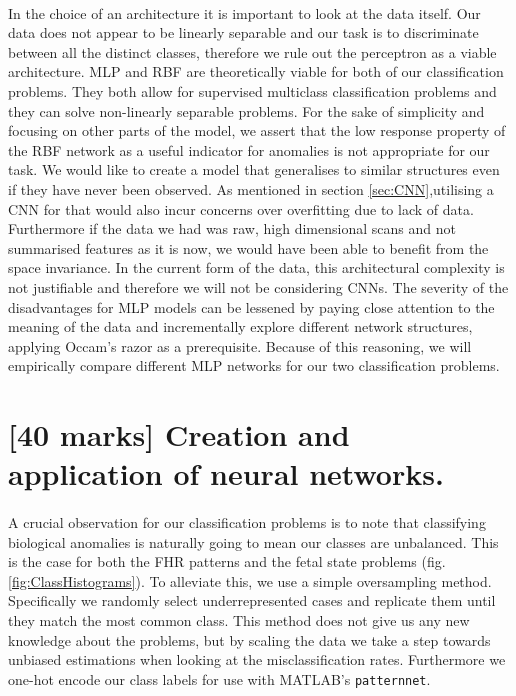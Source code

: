 \documentclass[11pt,a4paper]{article}
\begin{document}
\paragraph{}
In the choice of an architecture it is important to look at the data itself. Our data does not appear to be linearly separable and our task is to discriminate between all the distinct classes, therefore we rule out the perceptron as a viable architecture.
MLP and RBF are theoretically viable for both of our classification problems. They both allow for supervised multiclass classification problems and they can solve non-linearly separable problems. For the sake of simplicity and focusing on other parts of the model, we assert that the low response property of the RBF network as a useful indicator for anomalies is not appropriate for our task. We would like to create a model that generalises to similar structures even if they have never been observed. As mentioned in section \ref{sec:CNN},utilising a CNN for that would also incur concerns over overfitting due to lack of data. Furthermore if the data we had was raw, high dimensional scans and not summarised features as it is now, we would have been able to benefit from the space invariance. In the current form of the data, this architectural complexity is not justifiable and therefore we will not be considering CNNs.
The severity of the disadvantages for MLP models can be lessened by paying close attention to the meaning of the data and incrementally explore different network structures, applying Occam's razor as a prerequisite. Because of this reasoning, we will empirically compare different MLP networks for our two classification problems.

\section{[40 marks] Creation and application of neural networks.}
\label{sec:creation}
\paragraph{}
A crucial observation for our classification problems is to note that classifying biological anomalies is naturally going to mean our classes are unbalanced. This is the case for both the FHR patterns and the fetal state problems (fig. \ref{fig:ClassHistograms}). To alleviate this, we use a simple oversampling method. Specifically we randomly select underrepresented cases and replicate them until they match the most common class. This method does not give us any new knowledge about the problems, but by scaling the data we take a step towards unbiased estimations when looking at the misclassification rates. Furthermore we one-hot encode our class labels for use with MATLAB's \texttt{patternnet}.
\end{document}
